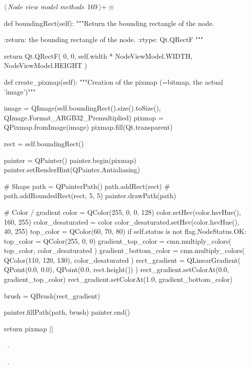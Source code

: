 \documentclass[%
    a4paper,    %
    justified,  %
    nobib,      %
    openany     %
]{tufte-book}
\begin{document}
\begin{flushleft} \small
\begin{minipage}{\linewidth}\label{scrap191}\raggedright\small
{} $\langle\,${\itshape Node view model methods}\nobreak\ {\footnotesize {169}}$\,\rangle+\equiv$
\vspace{-1ex}
\begin{pythoncode}
def boundingRect(self):
    """Return the bounding rectangle of the node.

    :return: the bounding rectangle of the node.
    :rtype: Qt.QRectF
    """

    return Qt.QRectF(
        0, 0, self.width * NodeViewModel.WIDTH, NodeViewModel.HEIGHT
    )

def create_pixmap(self):
    """Creation of the pixmap (=bitmap, the actual 'image')"""

    image = QImage(self.boundingRect().size().toSize(),
                    QImage.Format_ARGB32_Premultiplied)
    pixmap = QPixmap.fromImage(image)
    pixmap.fill(Qt.transparent)

    rect = self.boundingRect()

    painter = QPainter()
    painter.begin(pixmap)
    painter.setRenderHint(QPainter.Antialiasing)

    # Shape
    path = QPainterPath()
    path.addRect(rect)
    # path.addRoundedRect(rect, 5, 5)
    painter.drawPath(path)

    # Color / gradient
    color = QColor(255, 0, 0, 128)
    color.setHsv(color.hsvHue(), 160, 255)
    color_desaturated = color
    color_desaturated.setHsv(color.hsvHue(), 40, 255)
    top_color = QColor(60, 70, 80)
    if self.status is not flag.NodeStatus.OK:
        top_color = QColor(255, 0, 0)
    gradient_top_color = cmn.multiply_colors(
        top_color, color_desaturated
    )
    gradient_bottom_color = cmn.multiply_colors(
        QColor(110, 120, 130), color_desaturated
    )
    rect_gradient = QLinearGradient(
        QPoint(0.0, 0.0), QPoint(0.0, rect.height())
    )
    rect_gradient.setColorAt(0.0, gradient_top_color)
    rect_gradient.setColorAt(1.0, gradient_bottom_color)

    brush = QBrush(rect_gradient)

    painter.fillPath(path, brush)
    painter.end()

    return pixmap
|\NWsep|
\end{pythoncode}
\vspace{1.5ex}
\footnotesize
\begin{list}{}{\setlength{\itemsep}{-\parsep}\setlength{\itemindent}{-\leftmargin}}
\item \NWtxtMacroDefBy\ .
\item \NWtxtMacroRefIn\ .

\item{}
\end{list}
\end{minipage}\vspace{4ex}
\end{flushleft}
\end{document}
